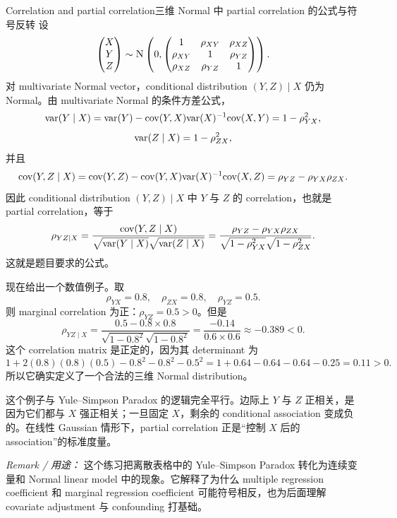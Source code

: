 \begin{exercisesolution}{Correlation and partial correlation}{三维 Normal 中 partial correlation 的公式与符号反转}
设
\[
\begin{pmatrix}
X\\Y\\Z
\end{pmatrix}
\sim
\textsc{N}\left(0,
\begin{pmatrix}
1&\rho_{XY}&\rho_{XZ}\\
\rho_{XY}&1&\rho_{YZ}\\
\rho_{XZ}&\rho_{YZ}&1
\end{pmatrix}
\right).
\]
对 multivariate Normal vector，conditional distribution $(Y,Z)\mid X$ 仍为 Normal。由 multivariate Normal 的条件方差公式，
\[
\textup{var}(Y\mid X)=\textup{var}(Y)-\textup{cov}(Y,X)\textup{var}(X)^{-1}\textup{cov}(X,Y)
=1-\rho_{YX}^2,
\]
\[
\textup{var}(Z\mid X)=1-\rho_{ZX}^2,
\]
并且
\[
\textup{cov}(Y,Z\mid X)
=\textup{cov}(Y,Z)-\textup{cov}(Y,X)\textup{var}(X)^{-1}\textup{cov}(X,Z)
=\rho_{YZ}-\rho_{YX}\rho_{ZX}.
\]
因此 conditional distribution $(Y,Z)\mid X$ 中 $Y$ 与 $Z$ 的 correlation，也就是 partial correlation，等于
\[
\rho_{YZ\mid X}
=
\frac{\textup{cov}(Y,Z\mid X)}
{\sqrt{\textup{var}(Y\mid X)}\sqrt{\textup{var}(Z\mid X)}}
=
\frac{\rho_{YZ}-\rho_{YX}\rho_{ZX}}
{\sqrt{1-\rho_{YX}^2}\sqrt{1-\rho_{ZX}^2}} .
\]
这就是题目要求的公式。

现在给出一个数值例子。取
\[
\rho_{YX}=0.8,\quad \rho_{ZX}=0.8,\quad \rho_{YZ}=0.5.
\]
则 marginal correlation 为正：$\rho_{YZ}=0.5>0$。但是
\[
\rho_{YZ\mid X}
=\frac{0.5-0.8\times 0.8}{\sqrt{1-0.8^2}\sqrt{1-0.8^2}}
=\frac{-0.14}{0.6\times 0.6}
\approx -0.389<0.
\]
这个 correlation matrix 是正定的，因为其 determinant 为
\[
1+2(0.8)(0.8)(0.5)-0.8^2-0.8^2-0.5^2
=1+0.64-0.64-0.64-0.25=0.11>0.
\]
所以它确实定义了一个合法的三维 Normal distribution。

这个例子与 Yule--Simpson Paradox 的逻辑完全平行。边际上 $Y$ 与 $Z$ 正相关，是因为它们都与 $X$ 强正相关；一旦固定 $X$，剩余的 conditional association 变成负的。在线性 Gaussian 情形下，partial correlation 正是“控制 $X$ 后的 association”的标准度量。

\emph{Remark / 用途：} 这个练习把离散表格中的 Yule--Simpson Paradox 转化为连续变量和 Normal linear model 中的现象。它解释了为什么 multiple regression coefficient 和 marginal regression coefficient 可能符号相反，也为后面理解 covariate adjustment 与 confounding 打基础。
\end{exercisesolution}


